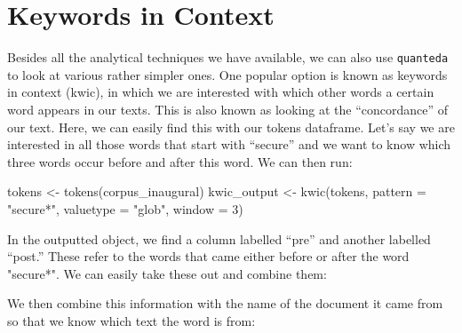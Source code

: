 \documentclass[
]{book}
\newenvironment{Shaded}{\begin{snugshade}}{\end{snugshade}}
\newcommand{\AttributeTok}[1]{\textcolor[rgb]{0.77,0.63,0.00}{#1}}
\newcommand{\DecValTok}[1]{\textcolor[rgb]{0.00,0.00,0.81}{#1}}
\newcommand{\FunctionTok}[1]{\textcolor[rgb]{0.00,0.00,0.00}{#1}}
\newcommand{\NormalTok}[1]{#1}
\newcommand{\OtherTok}[1]{\textcolor[rgb]{0.56,0.35,0.01}{#1}}
\newcommand{\SpecialCharTok}[1]{\textcolor[rgb]{0.00,0.00,0.00}{#1}}
\newcommand{\StringTok}[1]{\textcolor[rgb]{0.31,0.60,0.02}{#1}}
\begin{document}
\hypertarget{keywords-in-context}{%
\section{Keywords in Context}\label{keywords-in-context}}

Besides all the analytical techniques we have available, we can also use \texttt{quanteda} to look at various rather simpler ones. One popular option is known as keywords in context (kwic), in which we are interested with which other words a certain word appears in our texts. This is also known as looking at the ``concordance'' of our text. Here, we can easily find this with our tokens dataframe. Let's say we are interested in all those words that start with ``secure'' and we want to know which three words occur before and after this word. We can then run:

\begin{Shaded}
\begin{Highlighting}[]
\NormalTok{tokens }\OtherTok{\textless{}{-}} \FunctionTok{tokens}\NormalTok{(corpus\_inaugural)}
\NormalTok{kwic\_output }\OtherTok{\textless{}{-}} \FunctionTok{kwic}\NormalTok{(tokens, }\AttributeTok{pattern =} \StringTok{"secure*"}\NormalTok{, }\AttributeTok{valuetype =} \StringTok{"glob"}\NormalTok{, }\AttributeTok{window =} \DecValTok{3}\NormalTok{)}
\end{Highlighting}
\end{Shaded}

In the outputted object, we find a column labelled ``pre'' and another labelled ``post.'' These refer to the words that came either before or after the word "secure*". We can easily take these out and combine them:

\begin{Shaded}
\end{Shaded}

We then combine this information with the name of the document it came from so that we know which text the word is from:
\end{document}
